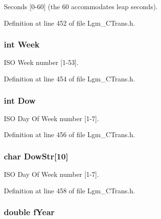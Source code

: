 Seconds \mbox{[}0-60\mbox{]} (the 60 accommodates leap seconds). 



Definition at line 452 of file Lgm\_\-CTrans.h.\hypertarget{struct_lgm___date_time_7fde89b8485dba1a7ec38f217d8461da}{
\subsubsection[{Week}]{\setlength{\rightskip}{0pt plus 5cm}int {\bf Week}}}
\label{struct_lgm___date_time_7fde89b8485dba1a7ec38f217d8461da}


ISO Week number \mbox{[}1-53\mbox{]}. 



Definition at line 454 of file Lgm\_\-CTrans.h.\hypertarget{struct_lgm___date_time_2f05d5502c47709f6d167b3089fe0cb5}{
\subsubsection[{Dow}]{\setlength{\rightskip}{0pt plus 5cm}int {\bf Dow}}}
\label{struct_lgm___date_time_2f05d5502c47709f6d167b3089fe0cb5}


ISO Day Of Week number \mbox{[}1-7\mbox{]}. 



Definition at line 456 of file Lgm\_\-CTrans.h.\hypertarget{struct_lgm___date_time_a1b057d9abe7b7bf59bc5fed9ce73149}{
\subsubsection[{DowStr}]{\setlength{\rightskip}{0pt plus 5cm}char {\bf DowStr}\mbox{[}10\mbox{]}}}
\label{struct_lgm___date_time_a1b057d9abe7b7bf59bc5fed9ce73149}


ISO Day Of Week number \mbox{[}1-7\mbox{]}. 



Definition at line 458 of file Lgm\_\-CTrans.h.\hypertarget{struct_lgm___date_time_808a323a95585d70c244f1e742061ae4}{
\subsubsection[{fYear}]{\setlength{\rightskip}{0pt plus 5cm}double {\bf fYear}}}
\label{struct_lgm___date_time_808a323a95585d70c244f1e742061ae4}



